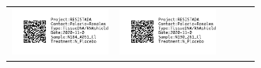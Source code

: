 \documentclass[10pt,notitlepage,letterpaper]{article}
\def\s{\phantom{xx}}
\def\w{1.27in}
\def\h{-0.030in}
\begin{document}
\begin{tabular}[t]{ c @{\s} c @{\s} c @{\s} c @{\s} c }
\includegraphics[width=\w]{label_N184_A051_Cl} & \includegraphics[width=\w]{label_N190_261_Cl} \\[\h] 


\end{tabular}
\end{document}

